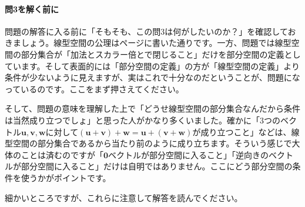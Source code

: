 \paragraph{問3を解く前に} 問題の解答に入る前に「そもそも、この問3は何がしたいのか？」を確認しておきましょう。線型空間の公理は\pageref{def:vector_space}ページに書いた通りです。一方、問題では線型空間の部分集合が「加法とスカラー倍とで閉じること」だけを部分空間の定義としています。そして表面的には「部分空間の定義」の方が「線型空間の定義」より条件が少ないように見えますが、実はこれで十分なのだということが、問題になっているのです。ここをまず押さえてください。

そして、問題の意味を理解した上で「どうせ線型空間の部分集合なんだから条件は当然成り立つでしょ」と思った人がかなり多くいました。確かに「$3$つのベクトル$\bm{u}, \bm{v}, \bm{w}$に対して$(\bm{u} + \bm{v}) + \bm{w} = \bm{u} + (\bm{v} + \bm{w})$が成り立つこと」などは、線型空間の部分集合であるから当たり前のように成り立ちます。そういう感じで大体のことは済むのですが「$\bm{0}$ベクトルが部分空間に入ること」「逆向きのベクトルが部分空間に入ること」だけは自明ではありません。ここにどう部分空間の条件を使うかがポイントです。

細かいところですが、これらに注意して解答を読んでください。

